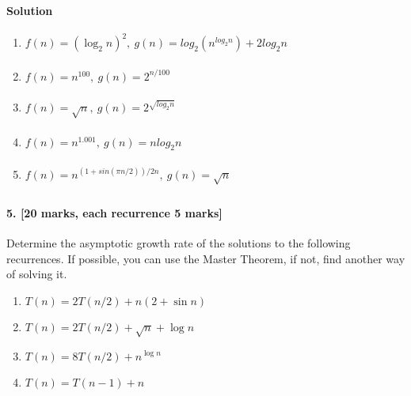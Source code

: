 \documentclass[a4paper]{scrartcl}
\begin{document}
\paragraph{Solution}
\begin{enumerate}[label=(\alph*)]
  \item $f(n)=\left(\log_2n\right)^2,\ g(n)=log_2\left(n^{log_2{n}}\right) + 2log_2n$
  \begin{align*}
  \end{align*}
  \item $f(n)= n^{100},\ g(n)=2^{n/100}$
  \begin{align*}
  \end{align*}
  \item $f(n)=\sqrt{n},\ g(n)=2^{\sqrt{log_2 n}}$
  \begin{align*}
  \end{align*}
  \item $f(n)=n^{1.001},\ g(n)=n log_2 n$
  \begin{align*}
  \end{align*}
  \item $f(n)=n^{(1+sin(\pi n/2))/2n},\ g(n)=\sqrt{n}$
  \begin{align*}
  \end{align*}
\end{enumerate}
\paragraph{5. [20 marks, each recurrence 5 marks]}
\label{sec:Question 5}
Determine the asymptotic growth rate of the solutions to the following recurrences. If possible, you can use the Master Theorem, if not, find another way of solving it.
\begin{enumerate}[label=(\alph*)]
  \item $T (n) = 2T (n/2) + n(2 + \sin{n})$
  \item $T (n) = 2T (n/2) + \sqrt{n} + \log{n}$
  \item $T (n) = 8T (n/2) + n^{\log{n}}$
  \item $T (n) = T (n − 1) + n$
\end{enumerate}
\end{document}
